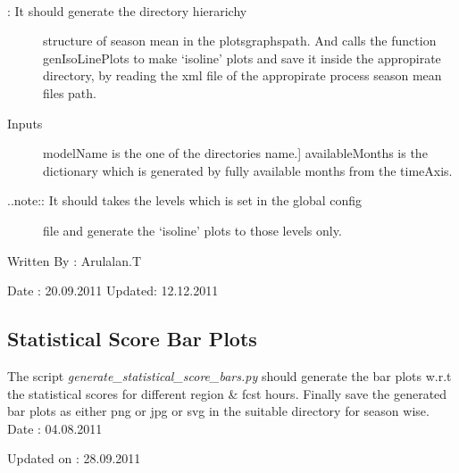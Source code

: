 \documentclass[letterpaper,10pt,english]{sphinxmanual}
\begin{document}
\begin{fulllineitems}
\label{diagnosis:generate_iso_plots.genSeasonMeanDirs}~\begin{description}
\item[{{\hyperref[diagnosis:generate_iso_plots.genSeasonMeanDirs]{}}: It should generate the directory hierarichy}] \leavevmode
structure of season mean in the plotsgraphspath. And calls the
function genIsoLinePlots to make `isoline' plots and save it inside the
appropirate directory, by reading the xml file of the appropirate
process season mean files path.

\item[{Inputs}] \leavevmode{[}modelName is the one of the directories name.{]}
availableMonths is the dictionary which is generated by fully
available months from the timeAxis.

\item[{..note:: It should takes the levels which is set in the global config}] \leavevmode
file and generate the `isoline' plots to those levels only.

\end{description}

Written By : Arulalan.T

Date : 20.09.2011
Updated: 12.12.2011

\end{fulllineitems}



\subsection{Statistical Score Bar Plots}
\label{diagnosis:statistical-score-bar-plots}
The script \emph{generate\_statistical\_score\_bars.py} should generate the bar plots w.r.t the statistical scores for different region \& fcst hours.
Finally save the generated bar plots as either png or jpg or svg in the suitable directory for season wise.
\label{diagnosis:module-generate_statistical_score_bars}\label{diagnosis:module-generate_statistical_score_bars.py}
Date : 04.08.2011

Updated on : 28.09.2011
\end{document}
